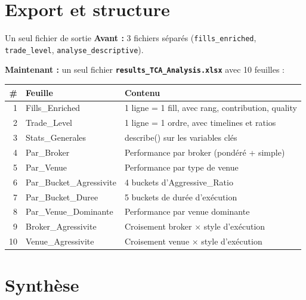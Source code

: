 \documentclass[10pt]{beamer}
\begin{document}
\section{Export et structure}

\begin{frame}{Un seul fichier de sortie}
\textbf{Avant :} 3 fichiers séparés (\texttt{fills\_enriched}, \texttt{trade\_level}, \texttt{analyse\_descriptive}).

\textbf{Maintenant :} un seul fichier \textbf{\texttt{results\_TCA\_Analysis.xlsx}} avec 10 feuilles :

\vspace{0.3cm}
\begin{tabular}{rlp{6cm}}
\toprule
\textbf{\#} & \textbf{Feuille} & \textbf{Contenu} \\
\midrule
1 & Fills\_Enriched & 1 ligne = 1 fill, avec rang, contribution, quality \\
2 & Trade\_Level & 1 ligne = 1 ordre, avec timelines et ratios \\
3 & Stats\_Generales & describe() sur les variables clés \\
4 & Par\_Broker & Performance par broker (pondéré + simple) \\
5 & Par\_Venue & Performance par type de venue \\
6 & Par\_Bucket\_Agressivite & 4 buckets d'Aggressive\_Ratio \\
7 & Par\_Bucket\_Duree & 5 buckets de durée d'exécution \\
8 & Par\_Venue\_Dominante & Performance par venue dominante \\
9 & Broker\_Agressivite & Croisement broker $\times$ style d'exécution \\
10 & Venue\_Agressivite & Croisement venue $\times$ style d'exécution \\
\bottomrule
\end{tabular}
\end{frame}

\section{Synthèse}
\end{document}
